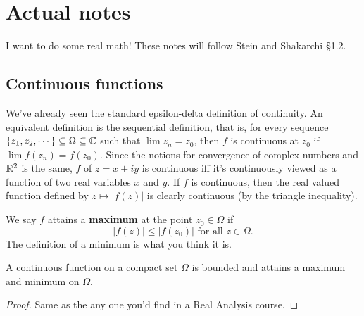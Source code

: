\section{Actual notes}
I want to do some real math! These notes will follow Stein and Shakarchi \S 1.2.
\subsection{Continuous functions}
We've already seen the standard epsilon-delta definition of continuity. An equivalent definition is the sequential definition, that is, for every sequence $\{z_1,z_2,\cdots\} \subseteq \Omega \subseteq \mathbb{C}$ such that $\lim z_n=z_0$, then $f$ is continuous at $z_0$ if $\lim f(z_n)=f(z_0)$. Since the notions for convergence of complex numbers and $\mathbb{R}^2$ is the same, $f$ of $z=x+iy$ is continuous iff it's continuously viewed as a function of two real variables $x$ and $y$. If $f$ is continuous, then the real valued function defined by $z\mapsto |f(z)|$ is clearly continuous (by the triangle inequality).

We say $f$ attains a \textbf{maximum} at the point $z_0\in \Omega$ if \[
    |f(z)|\leq |f(z_0)| \,\,\text{for all}\,\,  z\in \Omega.
\] The definition of a minimum is what you think it is.
\begin{theorem}
    A continuous function on a compact set $\Omega$ is bounded and attains a maximum and minimum on $\Omega$.
\end{theorem}
\begin{proof}
    Same as the any one you'd find in a Real Analysis course.
\end{proof}
